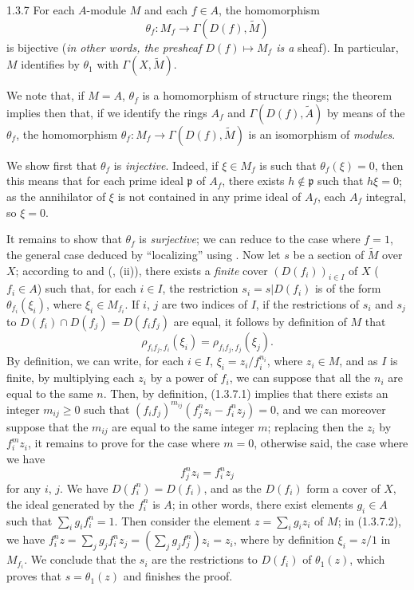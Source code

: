 \begin{envs}[Theorem]{1.3.7}
\label{thm-1.1.3.7}
For each $A$-module $M$ and each $f\in A$, the homomorphism
\[
  \theta_f:M_f\longrightarrow\Gamma(D(f),\widetilde{M})
\]
is bijective (\emph{in other words, the presheaf $D(f)\mapsto M_f$ is a} sheaf). In
particular, $M$ identifies by $\theta_1$ with $\Gamma(X,\widetilde{M})$.
\end{envs}

We note that, if $M=A$, $\theta_f$ is a homomorphism of structure rings; the theorem
 implies then that, if we identify the rings $A_f$ and
$\Gamma(D(f),\widetilde{A})$ by means of the $\theta_f$, the homomorphism
$\theta_f:M_f\to\Gamma(D(f),\widetilde{M})$ is an isomorphism of \emph{modules}.

We show first that $\theta_f$ is \emph{injective}. Indeed, if $\xi\in M_f$ is such that
$\theta_f(\xi)=0$, then this means that for each prime ideal $\mathfrak{p}$ of $A_f$, there
exists $h\not\in\mathfrak{p}$ such that $h\xi=0$; as the annihilator of $\xi$ is not
contained in any prime ideal of $A_f$, each $A_f$ integral, so $\xi=0$.

It remains to show that $\theta_f$ is \emph{surjective}; we can reduce to the case where
$f=1$, the general case deduced by ``localizing'' using . Now let $s$ be a
section of $\widetilde{M}$ over $X$; according to  and
(, (ii)), there exists a \emph{finite} cover $(D(f_i))_{i\in I}$ of $X$
($f_i\in A$) such that, for each $i\in I$, the restriction $s_i=s|D(f_i)$ is of the form
$\theta_{f_i}(\xi_i)$, where $\xi_i\in M_{f_i}$. If $i$, $j$ are two indices of $I$, if
the restrictions of $s_i$ and $s_j$ to $D(f_i)\cap D(f_j)=D(f_i f_j)$ are equal, it follows
by definition of $M$ that
\[
  \rho_{f_i f_j,f_i}(\xi_i)=\rho_{f_i f_j,f_j}(\xi_j).
  \tag{1.3.7.1}
\]
By definition, we can write, for each $i\in I$, $\xi_i=z_i/f_i^{n_i}$, where $z_i\in M$, and
as $I$ is finite, by multiplying each $z_i$ by a power of $f_i$, we can suppose that all the
$n_i$ are equal to the same $n$. Then, by definition, (1.3.7.1) implies that there exists an
integer $m_{ij}\geqslant 0$ such that $(f_i f_j)^{m_{ij}}(f_j^n z_i-f_i^n z_j)=0$, and we can
moreover suppose that the $m_{ij}$ are equal to the same integer $m$; replacing then the
$z_i$ by $f_i^m z_i$, it remains to prove for the case where $m=0$, otherwise said, the case
where we have
\[
  f_j^n z_i=f_i^n z_j
  \tag{1.3.7.2}
\]
for any $i$, $j$. We have $D(f_i^n)=D(f_i)$, and as the $D(f_i)$ form a cover of $X$,
the ideal generated by the $f_i^n$ is $A$; in other words, there exist elements $g_i\in A$
such that $\sum_i g_i f_i^n=1$. Then consider the element $z=\sum_i g_i z_i$ of $M$; in
(1.3.7.2), we have $f_i^n z=\sum_j g_j f_i^n z_j=(\sum_j g_j f_j^n)z_i=z_i$, where by
definition $\xi_i=z/1$ in $M_{f_i}$. We conclude
that the $s_i$ are the restrictions to $D(f_i)$ of $\theta_1(z)$, which proves that
$s=\theta_1(z)$ and finishes the proof.

